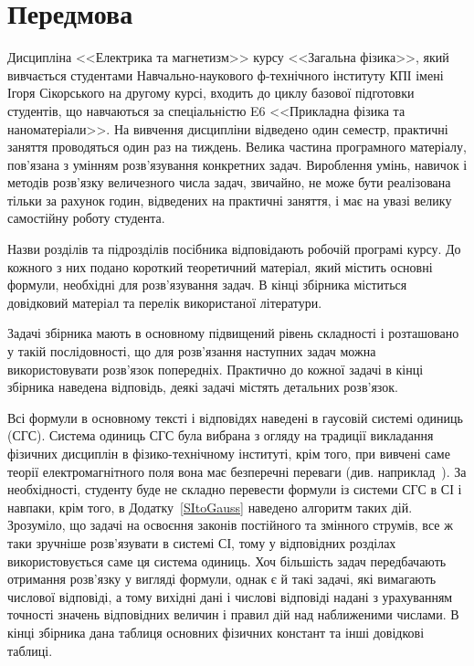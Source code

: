 
\introtrue
\chapter*{Передмова}

Дисципліна <<Електрика та магнетизм>> курсу <<Загальна фізика>>, який вивчається студентами Навчально-наукового ф-технічного інституту КПІ імені Ігоря Сікорського на другому курсі, входить до циклу базової підготовки студентів, що навчаються за спеціальністю E6 <<Прикладна фізика та наноматеріали>>. На вивчення дисципліни відведено один семестр, практичні заняття проводяться один раз на тиждень. Велика частина програмного матеріалу, пов'язана з умінням розв'язування конкретних задач. Вироблення умінь, навичок і методів розв'язку величезного числа задач, звичайно, не може бути реалізована тільки за рахунок годин, відведених на практичні заняття, і має на увазі велику самостійну роботу студента.

Назви розділів та підрозділів посібника відповідають робочій програмі курсу. До кожного з них подано короткий теоретичний матеріал, який містить основні формули, необхідні для розв'язування задач. В кінці збірника міститься довідковий матеріал та перелік використаної літератури.

Задачі збірника мають в основному підвищений рівень складності і розташовано у такій послідовності, що для розв'язання наступних задач можна використовувати розв'язок попередніх. Практично до кожної задачі  в кінці збірника наведена відповідь, деякі задачі містять детальних розв'язок.

Всі формули в основному тексті і відповідях наведені в гаусовій системі одиниць (СГС). Система одиниць СГС була вибрана з огляду на традиції викладання фізичних дисциплін в фізико-технічному інституті, крім того, при вивчені саме теорії електромагнітного поля вона має безперечні переваги (див. наприклад~\cite[\S85]{Siv3}). За необхідності, студенту буде не складно перевести формули із системи СГС в СІ і навпаки, крім того, в Додатку~\ref{SItoGauss} наведено алгоритм таких дій. Зрозуміло, що задачі на освоєння законів постійного та змінного струмів, все ж таки зручніше розв'язувати в системі СІ, тому у відповідних розділах використовується саме ця система одиниць. Хоч більшість задач передбачають отримання розв'язку у вигляді формули, однак є й такі задачі, які вимагають числової відповіді, а тому вихідні дані і числові відповіді надані з урахуванням точності значень відповідних величин і правил дій над наближеними числами. В кінці збірника дана таблиця основних фізичних констант та інші довідкові таблиці.

